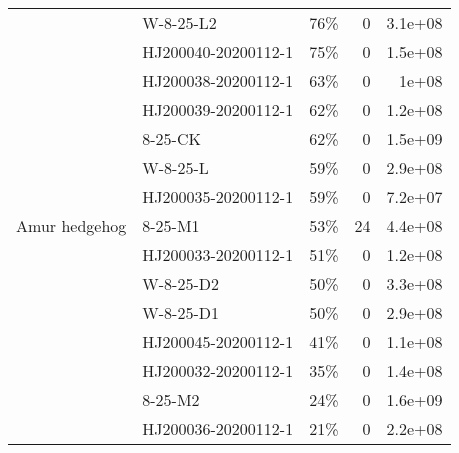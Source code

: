 \begin{tabular}{llrrr}
\cline{1-5}
\multirow{15}{*}{Amur hedgehog} & W-8-25-L2 &                                       76\% &                        0 &                   3.1e+08 \\
                  & HJ200040-20200112-1 &                                       75\% &                        0 &                   1.5e+08 \\
                  & HJ200038-20200112-1 &                                       63\% &                        0 &                     1e+08 \\
                  & HJ200039-20200112-1 &                                       62\% &                        0 &                   1.2e+08 \\
                  & 8-25-CK &                                       62\% &                        0 &                   1.5e+09 \\
                  & W-8-25-L &                                       59\% &                        0 &                   2.9e+08 \\
                  & HJ200035-20200112-1 &                                       59\% &                        0 &                   7.2e+07 \\
                  & 8-25-M1 &                                       53\% &                       24 &                   4.4e+08 \\
                  & HJ200033-20200112-1 &                                       51\% &                        0 &                   1.2e+08 \\
                  & W-8-25-D2 &                                       50\% &                        0 &                   3.3e+08 \\
                  & W-8-25-D1 &                                       50\% &                        0 &                   2.9e+08 \\
                  & HJ200045-20200112-1 &                                       41\% &                        0 &                   1.1e+08 \\
                  & HJ200032-20200112-1 &                                       35\% &                        0 &                   1.4e+08 \\
                  & 8-25-M2 &                                       24\% &                        0 &                   1.6e+09 \\
                  & HJ200036-20200112-1 &                                       21\% &                        0 &                   2.2e+08 \\

\end{tabular}
